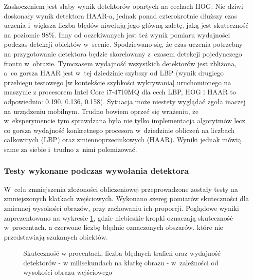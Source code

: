 Zaskoczeniem jest słaby wynik detektorów opartych na cechach HOG. Nie dziwi doskonały
wynik detektora HAAR-a, jednak ponad czterokrotnie dłuższy czas uczenia i~większa 
liczba błędów niwelują jego główną zaletę, jaką jest skuteczność na poziomie 98\%.
Inny od oczekiwanych jest też wynik pomiaru wydajności podczas detekcji obiektów
w~scenie. Spodziewano się, że czas uczenia potrzebny na przygotowanie detektora
będzie skorelowany z~czasem detekcji pojedynczego frontu w~obrazie.
Tymczasem wydajność wszystkich detektorów jest zbliżona, a~co 
gorsza HAAR jest w~tej dziedzinie szybszy od LBP
(wynik drugiego przebiegu testowego [w kontekście szybkości wykrywania] 
uruchomionego na maszynie
z procesorem Intel Core i7-4710MQ dla cech LBP, HOG i HAAR to odpowiednio: 0.190, 
0.136, 0.158). Sytuacja może niestety wyglądać zgoła inaczej na urządzeniu
mobilnym. Trudno bowiem oprzeć się wrażeniu, że w~eksperymencie tym
sprawdzana była nie tylko implementacja algorytmów lecz co gorsza 
wydajność konkretnego procesora w~dziedzinie obliczeń na liczbach całkowitych
(LBP) oraz zmiennoprzecinkowych (HAAR). Wyniki jednak mówią same za
siebie i~trudno z~nimi polemizować.

\subsubsection{Testy wykonane podczas wywołania detektora}

W~celu zmniejszenia złożoności obliczeniowej przeprowadzone zostały
testy na zmniejszonych klatkach wejściowych. 
Wykonano szereg pomiarów skuteczności dla zmiennej
wysokości obrazów, przy zachowaniu ich proporcji. Poglądowe wyniki zaprezentowano na
wykresie \ref{chart:img_height2hitratio}, gdzie niebieskie kropki oznaczają skuteczność w~procentach, a czerwone liczbę
błędnie oznaczonych obszarów, które nie przedstawiają szukanych obiektów.

\begin{figure}[h!]
	\begin{center}
	\end{center}
	\caption{Skuteczność w procentach, liczba błędnych trafień oraz
		wydajność detektorów - w milisekundach na klatkę obrazu -
		w~zależności od wysokości obrazu wejściowego}
	\label{chart:img_height2hitratio}
\end{figure}

